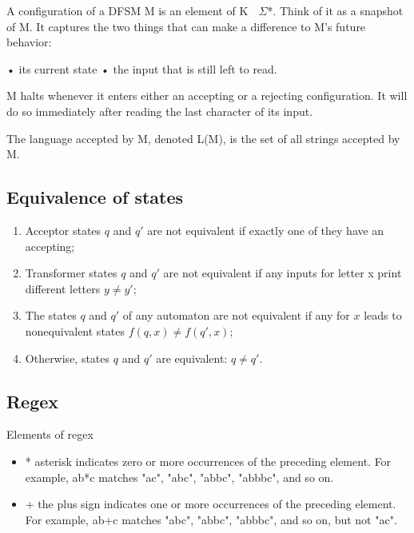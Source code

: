 \documentclass{article}
\begin{document}
A configuration of a DFSM M is an element of K  $\Sigma$*. Think of it as a snapshot
of M. It captures the two things that can make a difference to M’s future
behavior:

• its current state • the input that is still left to read.

M halts whenever it enters either an accepting or a rejecting configuration. It
will do so immediately after reading the last character of its input.

The language accepted by M, denoted L(M), is the set of all strings accepted by
M.

\subsection{Equivalence of states}

\begin{enumerate}
		\item Acceptor states $q$ and $q'$ are not equivalent if exactly one of
		they have an accepting;

		\item Transformer states $q$ and $q'$ are not equivalent if any inputs
		for letter x print different letters $y \ne y'$;

		\item The states $q$ and $q'$ of any automaton are not equivalent if any
		for $x$ leads to nonequivalent states $f(q,x) \ne f(q',x)$;

		\item Otherwise, states $q$ and $q'$ are equivalent: $q \ne q'$.
\end{enumerate}

\subsection{Regex}

Elements of regex

\begin{itemize}
	 
		\item * asterisk indicates zero or more occurrences of the preceding element.
		For example, ab*c matches "ac", "abc", "abbc", "abbbc", and so on. 

		\item + the plus sign indicates one or more occurrences of the preceding element.
		For example, ab+c matches "abc", "abbc", "abbbc", and so on, but not "ac". 
\end{itemize}
\end{document}
